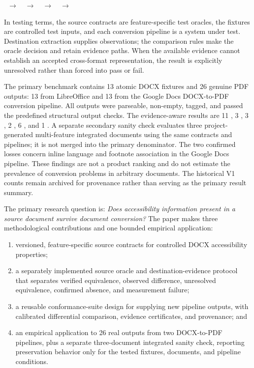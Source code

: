 \begin{center}
\ $\rightarrow$\ 
\ $\rightarrow$\ 
\ $\rightarrow$\ 
\ $\rightarrow$\ 
\end{center}

In testing terms, the source contracts are feature-specific test oracles, the fixtures are controlled test inputs, and each conversion pipeline is a system under test. Destination extraction supplies observations; the comparison rules make the oracle decision and retain evidence paths. When the available evidence cannot establish an accepted cross-format representation, the result is explicitly unresolved rather than forced into pass or fail.

The primary benchmark contains 13 atomic DOCX fixtures and 26 genuine PDF outputs: 13 from LibreOffice and 13 from the Google Docs DOCX-to-PDF conversion pipeline. All outputs were parseable, non-empty, tagged, and passed the predefined structural output checks. The evidence-aware results are 11 \verifiedpreserved{}, 3 \observedpartial{}, 3 \altered{}, 2 \confirmedlost{}, 6 \unresolved{}, and 1 \measured{}. A separate secondary sanity check evaluates three project-generated multi-feature integrated documents using the same contracts and pipelines; it is not merged into the primary denominator. The two confirmed losses concern inline language and footnote association in the Google Docs pipeline. These findings are not a product ranking and do not estimate the prevalence of conversion problems in arbitrary documents. The historical V1 counts remain archived for provenance rather than serving as the primary result summary.

The primary research question is: \emph{Does accessibility information present in a source document survive document conversion?} The paper makes three methodological contributions and one bounded empirical application:

\begin{enumerate}
\item versioned, feature-specific source contracts for controlled DOCX accessibility properties;
\item a separately implemented source oracle and destination-evidence protocol that separates verified equivalence, observed difference, unresolved equivalence, confirmed absence, and measurement failure;
\item a reusable conformance-suite design for supplying new pipeline outputs, with calibrated differential comparison, evidence certificates, and provenance; and
\item an empirical application to 26 real outputs from two DOCX-to-PDF pipelines, plus a separate three-document integrated sanity check, reporting preservation behavior only for the tested fixtures, documents, and pipeline conditions.
\end{enumerate}

